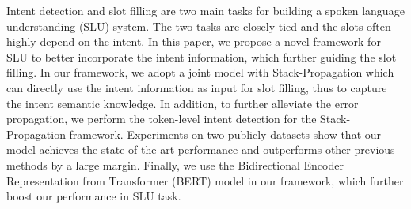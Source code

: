 Intent detection and slot filling are two main tasks for building a spoken language understanding (SLU) system. 
The two tasks are closely tied and the slots often highly depend on the intent. 
In this paper, we propose a novel framework for SLU to better incorporate the intent information, which further guiding the slot filling.
In our framework, we adopt a joint model with Stack-Propagation which can directly use the intent information as input for slot filling, thus to capture the intent semantic knowledge.
In addition, to further alleviate the error propagation, we perform the token-level intent detection for the Stack-Propagation framework.
Experiments on two publicly datasets show that our model achieves the state-of-the-art 
performance and outperforms other previous methods by a large margin. 
Finally, we use the Bidirectional Encoder 
Representation from Transformer (BERT) model in our framework, which further boost our performance in SLU task.